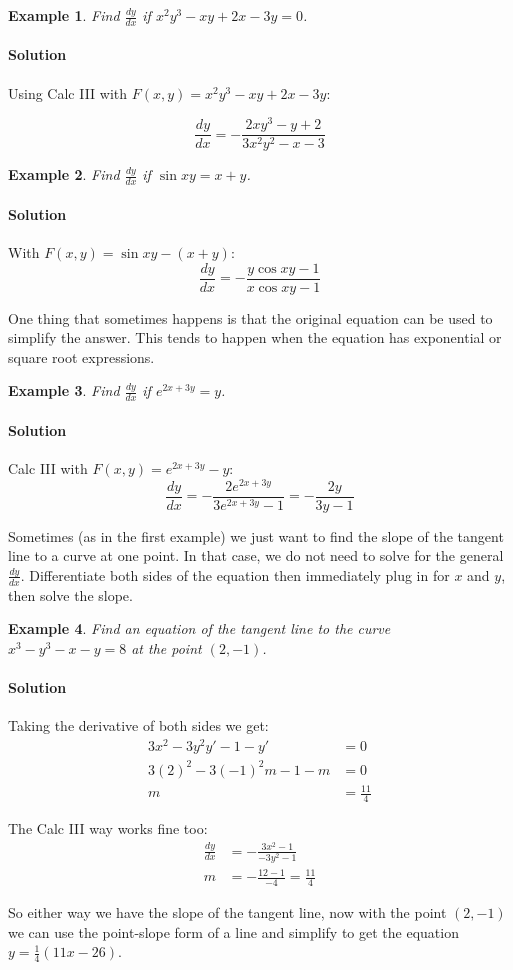 \documentclass[letterpaper, 11pt, openany]{book}
\theoremstyle{mytheoremstyle}
\theoremstyle{myexamplestyle}
\newtheorem{example}{Example}[section]
\newenvironment{solution}{\paragraph{\sffamily \smaller \fontseries{b}\selectfont Solution}}{\hfill\faSquare}
\begin{document}
\begin{example}
    Find \(\frac{dy}{dx}\) if \(x^{2}y^{3} - xy + 2x - 3y = 0\).
\end{example}
\begin{solution}\label{e:implicit-diff-polynomial}
    Using Calc III with \(F(x,y) = x^{2}y^{3} - xy + 2x - 3y\):
    
    \[\frac{dy}{dx} = -\frac{2xy^{3} - y + 2}{3x^{2}y^{2} - x - 3}\]
   
\end{solution}

\begin{example}\label{e:implicit-diff-sine}
    Find \(\frac{dy}{dx}\) if \(\sin xy = x + y\).
\end{example}
\begin{solution}
    With \(F(x,y) = \sin xy - (x + y)\):
    \[ \frac{dy}{dx} = - \frac{y\cos xy - 1}{x\cos xy - 1} \]
\end{solution}

One thing that sometimes happens is that the original equation can be used to simplify the answer. This tends to happen when the equation has exponential or square root expressions.

\begin{example}\label{e:implicit-diff-sub}
    Find \(\frac{dy}{dx}\) if \(e^{2x+3y} = y\). 
\end{example}
\begin{solution}
    Calc III with \(F(x,y) = e^{2x+3y} - y\):
    \[\frac{dy}{dx} = - \frac{2e^{2x+3y}}{3e^{2x+3y} - 1} = -\frac{2y}{3y - 1}\]
\end{solution}

Sometimes (as in the first example) we just want to find the slope of the tangent line to a curve at one point. In that case, we do not need to solve for the general \(\frac{dy}{dx}\). Differentiate both sides of the equation then immediately plug in for \(x\) and \(y\), then solve the slope.

\begin{example}\label{e:implicit-diff-slope}
    Find an equation of the tangent line to the curve \(x^{3} - y^{3} - x - y = 8\) at the point \((2, -1)\).
\end{example}
\begin{solution}
    Taking the derivative of both sides we get:
    \begin{align*}
        3x^{2} - 3y^{2}y' - 1 - y' &= 0\\
        3(2)^{2} - 3(-1)^{2}m - 1 - m &= 0\\
        m &= \frac{11}{4}
    \end{align*}

    The Calc III way works fine too:
    \begin{align*}
        \frac{dy}{dx} &= - \frac{3x^{2} - 1}{-3y^{2} - 1}\\
        m &= - \frac{12-1}{-4} = \frac{11}{4}
    \end{align*}

    So either way we have the slope of the tangent line, now with the point \((2,-1)\) we can use the point-slope form of a line and simplify to get the equation \(y = \frac{1}{4} (11 x-26)\).
\end{solution}
\end{document}
